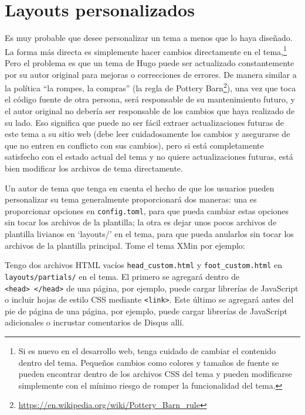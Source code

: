\documentclass[12pt,]{krantz}
\renewcommand{\href}[2]{#2\footnote{\url{#1}}}
\theoremstyle{definition}
\theoremstyle{definition}
\theoremstyle{definition}
\theoremstyle{remark}
\begin{document}
\hypertarget{layouts-personalizados}{%
\section{Layouts personalizados}\label{layouts-personalizados}}

Es muy probable que desee personalizar un tema a menos que lo haya
diseñado. La forma más directa es simplemente hacer cambios directamente
en el tema,\footnote{Si es nuevo en el desarrollo web, tenga cuidado de
  cambiar el contenido dentro del tema. Pequeños cambios como colores y
  tamaños de fuente se pueden encontrar dentro de los archivos CSS del
  tema y pueden modificarse simplemente con el mínimo riesgo de romper
  la funcionalidad del tema.} Pero el problema es que un tema de Hugo
puede ser actualizado constantemente por su autor original para mejoras
o correcciones de errores. De manera similar a la política ``la rompes,
la compras'' (la
\href{https://en.wikipedia.org/wiki/Pottery_Barn_rule}{regla de Pottery
Barn}), una vez que toca el código fuente de otra persona, será
responsable de su mantenimiento futuro, y el autor original no debería
ser responsable de los cambios que haya realizado de su lado. Eso
significa que puede no ser fácil extraer actualizaciones futuras de este
tema a su sitio web (debe leer cuidadosamente los cambios y asegurarse
de que no entren en conflicto con sus cambios), pero si está
completamente satisfecho con el estado actual del tema y no quiere
actualizaciones futuras, está bien modificar los archivos de tema
directamente.

Un autor de tema que tenga en cuenta el hecho de que los usuarios pueden
personalizar su tema generalmente proporcionará dos maneras: una es
proporcionar opciones en \texttt{config.toml}, para que pueda cambiar
estas opciones sin tocar los archivos de la plantilla; la otra es dejar
unos pocos archivos de plantilla livianos en `layouts/' en el tema, para
que pueda anularlos sin tocar los archivos de la plantilla principal.
Tome el tema XMin por ejemplo:

Tengo dos archivos HTML vacíos \texttt{head\_custom.html} y
\texttt{foot\_custom.html} en \texttt{layouts/partials/} en el tema. El
primero se agregará dentro de
\texttt{\textless{}head\textgreater{}\ \textless{}/head\textgreater{}}
de una página, por ejemplo, puede cargar librerías de JavaScript o
incluir hojas de estilo CSS mediante
\texttt{\textless{}link\textgreater{}}. Este último se agregará antes
del pie de página de una página, por ejemplo, puede cargar librerías de
JavaScript adicionales o incrustar comentarios de Disqus allí.
\end{document}
